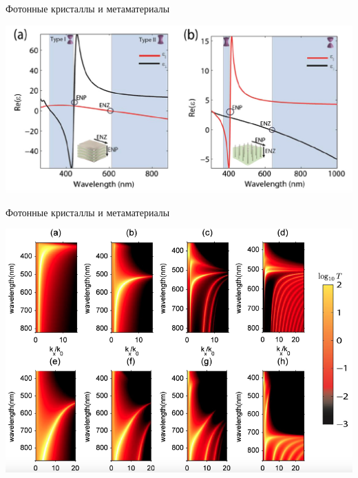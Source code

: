 \documentclass[9pt, compress, xcolor=table]{beamer}
\begin{document}
\begin{frame}{Фотонные кристаллы и метаматериалы}
\begin{center}
\includegraphics[width=\textwidth]{disp1}
 \end{center}
\end{frame}

\begin{frame}{Фотонные кристаллы и метаматериалы}
\begin{center}
\includegraphics[width=\textwidth]{disp}
 \end{center}
\end{frame}
\end{document}
